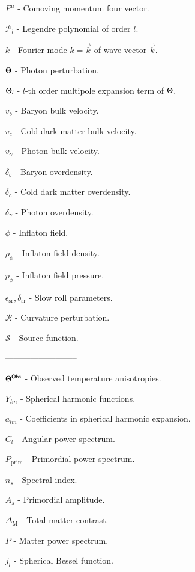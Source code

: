 \begin{itemize}
    \item[$P^\mu$]- Comoving momentum four vector.
    \item[$\mathcal{P}_l$] - Legendre polynomial of order $l$.
    \item[$k$] - Fourier mode $k=\vec{k}$ of wave vector $\vec{k}$. 
    \item[$\Theta$] - Photon perturbation.
    \item[$\Theta_l$] - $l$-th order multipole expansion term of $\Theta$.
    \item[$v_b$] - Baryon bulk velocity.
    \item[$v_c$] - Cold dark matter bulk velocity.
    \item[$v_\gamma$] - Photon bulk velocity. 
    \item[$\delta_b$] - Baryon overdensity.
    \item[$\delta_c$] - Cold dark matter overdensity.         
    \item[$\delta_\gamma$] - Photon overdensity.
    \item[$\phi$] - Inflaton field. 
    \item[$\rho_\phi$] - Inflaton field density.
    \item[$p_\phi$] - Inflaton field pressure.
    \item[$\epsilon_\mathrm{sr}, \delta_\mathrm{sr}$] - Slow roll parameters.  
    \item[$\mathcal{R}$] - Curvature perturbation.
    \item[$\mathcal{S}$] - Source function.  
    \item[] --------------------------
    \item[$\Theta^\mathrm{Obs}$] - Observed temperature anisotropies.  
    \item[$Y_{lm}$] - Spherical harmonic functions.  
    \item[$a_{lm}$] - Coefficients in spherical harmonic expansion. 
    \item[$C_l$] - Angular power spectrum.
    \item[$P_\mathrm{prim}$] - Primordial power spectrum.
    \item[$n_s$] - Spectral index.
    \item[$A_s$] - Primordial amplitude.  
    \item[$\Delta_\mathrm{M}$] - Total matter contrast.
    \item[$P$] - Matter power spectrum. 
    \item[$j_l$] - Spherical Bessel function.  
\end{itemize}

